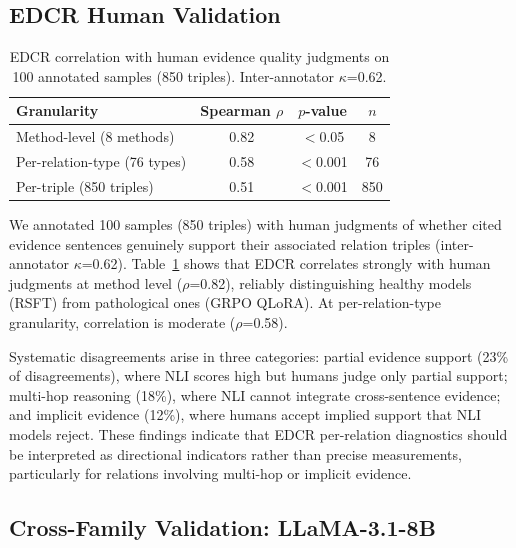 \documentclass[11pt,a4paper]{article}
\begin{document}
\subsection{EDCR Human Validation}
\label{sec:edcr-validation}

\begin{table}[t]
\centering
\small
\begin{tabular}{lccc}
\toprule
\textbf{Granularity} & \textbf{Spearman $\rho$} & \textbf{$p$-value} & \textbf{$n$} \\
\midrule
Method-level (8 methods) & 0.82 & $<$0.05 & 8 \\
Per-relation-type (76 types) & 0.58 & $<$0.001 & 76 \\
Per-triple (850 triples) & 0.51 & $<$0.001 & 850 \\
\bottomrule
\end{tabular}
\caption{EDCR correlation with human evidence quality judgments on 100 annotated samples (850 triples). Inter-annotator $\kappa$=0.62.}
\label{tab:edcr-human}
\end{table}

We annotated 100 samples (850 triples) with human judgments of whether cited evidence sentences genuinely support their associated relation triples (inter-annotator $\kappa$=0.62). Table~\ref{tab:edcr-human} shows that EDCR correlates strongly with human judgments at method level ($\rho$=0.82), reliably distinguishing healthy models (RSFT) from pathological ones (GRPO QLoRA). At per-relation-type granularity, correlation is moderate ($\rho$=0.58).

Systematic disagreements arise in three categories: partial evidence support (23\% of disagreements), where NLI scores high but humans judge only partial support; multi-hop reasoning (18\%), where NLI cannot integrate cross-sentence evidence; and implicit evidence (12\%), where humans accept implied support that NLI models reject. These findings indicate that EDCR per-relation diagnostics should be interpreted as directional indicators rather than precise measurements, particularly for relations involving multi-hop or implicit evidence.

\subsection{Cross-Family Validation: LLaMA-3.1-8B}
\label{sec:cross-family}
\end{document}
